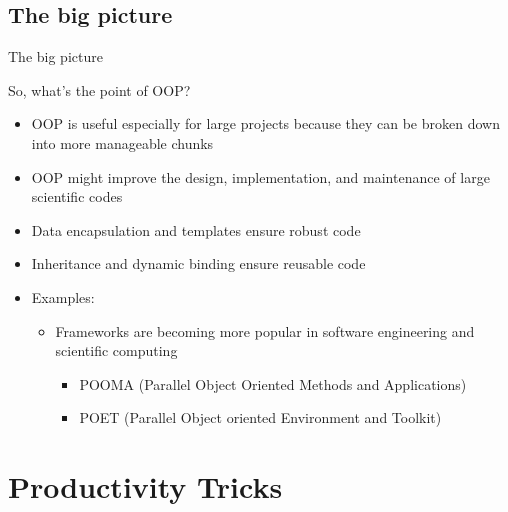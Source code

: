 \documentclass[compress]{beamer}
\begin{document}
\subsection{The big picture}
\begin{frame}{The big picture}
	\begin{alertblock}{So, what's the point of OOP?}
		\begin{itemize}
			
			\item OOP is useful especially for large projects because they can be broken down into more manageable chunks
			\item OOP might improve the design, implementation, and maintenance of large scientific codes
			\item Data encapsulation and templates ensure robust code
			\item Inheritance and dynamic binding ensure reusable code
			\item Examples:
			 \begin{itemize}
			 	\item Frameworks are becoming more popular in software engineering and scientific computing
			 	\begin{itemize}
			 		\item POOMA (Parallel Object Oriented Methods and Applications)
			 		\item POET (Parallel Object oriented Environment and Toolkit)
			 	\end{itemize}
			 \end{itemize}		
		\end{itemize}
	\end{alertblock}
\end{frame}



\section{Productivity Tricks}
\end{document}
